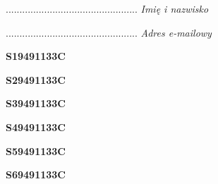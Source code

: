 \begin{turn}{90}\begin{minipage}{\linewidth} \vspace{20mm} ................................................  \textit{Imię i nazwisko}\end{minipage}\end{turn}

\begin{turn}{90}\begin{minipage}{\linewidth} \vspace{20mm} ................................................  \textit{Adres e-mailowy}\end{minipage}\end{turn}

\begin{turn}{90}\huge \begin{minipage}{\linewidth} \vspace{10mm}\textbf{S19491133C}\end{minipage}\end{turn}

\begin{turn}{90}\huge \begin{minipage}{\linewidth} \vspace{10mm}\textbf{S29491133C}\end{minipage}\end{turn}

\begin{turn}{90}\huge \begin{minipage}{\linewidth} \vspace{10mm}\textbf{S39491133C}\end{minipage}\end{turn}

\begin{turn}{90}\huge \begin{minipage}{\linewidth} \vspace{10mm}\textbf{S49491133C}\end{minipage}\end{turn}

\begin{turn}{90}\huge \begin{minipage}{\linewidth} \vspace{10mm}\textbf{S59491133C}\end{minipage}\end{turn}

\begin{turn}{90}\huge \begin{minipage}{\linewidth} \vspace{10mm}\textbf{S69491133C}\end{minipage}\end{turn}


